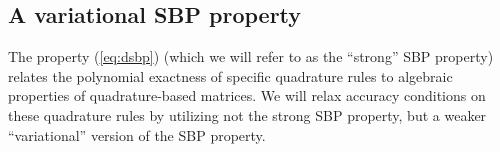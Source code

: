 \documentclass[review]{siamart0216}
\theoremstyle{assumption}
\begin{document}
%


\subsection{A variational SBP property}


The property (\ref{eq:dsbp}) (which we will refer to as the ``strong'' SBP property) relates the polynomial exactness of specific quadrature rules to algebraic properties of quadrature-based matrices.  We will relax accuracy conditions on these quadrature rules by utilizing not the strong SBP property, but a weaker ``variational'' version of the SBP property.  
\end{document}
